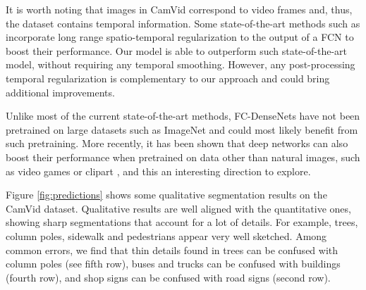 \documentclass[10pt,twocolumn,letterpaper]{article}
\begin{document}
It is worth noting that images in CamVid correspond to video frames and, thus, the dataset contains temporal information. Some state-of-the-art methods such as \cite{KunduCVPR16} incorporate long range spatio-temporal regularization to the output of a FCN to boost their performance. Our model is able to outperform such state-of-the-art model, without requiring any temporal smoothing. However, any post-processing temporal regularization is complementary to our approach and could bring additional improvements.

Unlike most of the current state-of-the-art methods, FC-DenseNets have not been pretrained on large datasets such as ImageNet \cite{imagenet_cvpr09} and could most likely benefit from such pretraining. More recently, it has been shown that deep networks can also boost their performance when pretrained on data other than natural images, such as video games \cite{Richter_2016_ECCV,Ros_2016_CVPR} or clipart \cite{CastrejonAVPT16}, and this an interesting direction to explore.

Figure \ref{fig:predictions} shows some qualitative segmentation results on the CamVid dataset. Qualitative results are well aligned with the quantitative ones, showing sharp segmentations that account for a lot of details. For example, trees, column poles, sidewalk and pedestrians appear very well sketched. Among common errors, we find that thin details found in trees can be confused with column poles (see fifth row), buses and trucks can be confused with buildings (fourth row), and shop signs can be confused with road signs (second row).  
\end{document}
